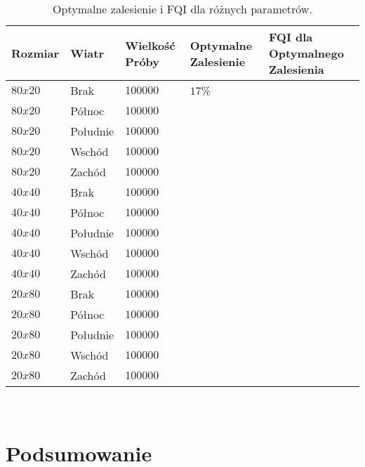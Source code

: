 \documentclass{article}
\begin{document}
\begin{table}[h]
\centering
\begin{tabular}{|l|l|l|l|l|}\hline
Rozmiar & Wiatr & Wielkość Próby & Optymalne Zalesienie & FQI dla Optymalnego Zalesienia \\\hline
 $80x20$ & Brak & $100 000$ & $17$\% & \\\hline
 $80x20$ & Północ & $100 000$ &  & \\\hline
 $80x20$ & Południe & $100 000$ &  & \\\hline
 $80x20$ & Wschód & $100 000$ &  & \\\hline
 $80x20$ & Zachód & $100 000$ &  & \\\hline
 $40x40$ & Brak & $100 000$ &  & \\\hline
 $40x40$ & Północ & $100 000$ &  & \\\hline
 $40x40$ & Południe & $100 000$ &  & \\\hline
 $40x40$ & Wschód & $100 000$ &  & \\\hline
 $40x40$ & Zachód & $100 000$ &  & \\\hline
 $20x80$ & Brak & $100 000$ &  & \\\hline
 $20x80$ & Północ & $100 000$ &  & \\\hline
 $20x80$ & Południe & $100 000$ &  & \\\hline
 $20x80$ & Wschód & $100 000$ &  & \\\hline
 $20x80$ & Zachód & $100 000$ &  & \\\hline
\end{tabular}
\caption{\label{tab:h1} Optymalne zalesienie i FQI dla różnych parametrów.}
\end{table}\\

\section{Podsumowanie}

\\
\end{document}
